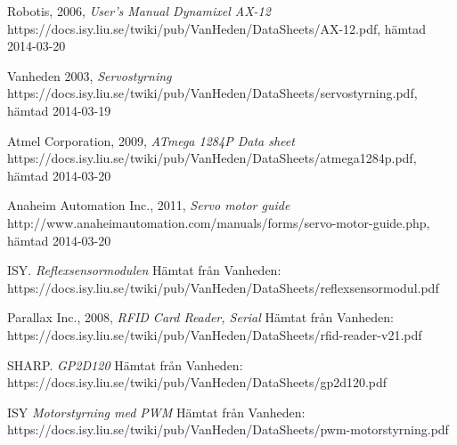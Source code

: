 \documentclass[a4paper,12pt]{article}
\begin{document}
\newpage
\begin{thebibliography}{9}

 Robotis, 2006, \emph{User's Manual Dynamixel AX-12}
\\ https://docs.isy.liu.se/twiki/pub/VanHeden/DataSheets/AX-12.pdf, hämtad 2014-03-20

 Vanheden 2003, \emph{Servostyrning}
\\https://docs.isy.liu.se/twiki/pub/VanHeden/DataSheets/servostyrning.pdf, hämtad 2014-03-19

 Atmel Corporation, 2009, \emph{ATmega 1284P Data sheet}
\\https://docs.isy.liu.se/twiki/pub/VanHeden/DataSheets/atmega1284p.pdf, hämtad 2014-03-20

 Anaheim Automation Inc., 2011, \emph{Servo motor guide}
\\ http://www.anaheimautomation.com/manuals/forms/servo-motor-guide.php, hämtad 2014-03-20

 ISY.  \emph{Reflexsensormodulen} Hämtat från Vanheden: 
\\https://docs.isy.liu.se/twiki/pub/VanHeden/DataSheets/reflexsensormodul.pdf 

 Parallax Inc., 2008, \emph{RFID Card Reader, Serial} Hämtat från Vanheden: 
\\https://docs.isy.liu.se/twiki/pub/VanHeden/DataSheets/rfid-reader-v21.pdf

 SHARP. \emph{GP2D120} Hämtat från Vanheden: 
\\ https://docs.isy.liu.se/twiki/pub/VanHeden/DataSheets/gp2d120.pdf

 ISY \emph{Motorstyrning med PWM} Hämtat från Vanheden:
\\ https://docs.isy.liu.se/twiki/pub/VanHeden/DataSheets/pwm-motorstyrning.pdf



\end{thebibliography}

\newpage
\appendix


\end{document}
